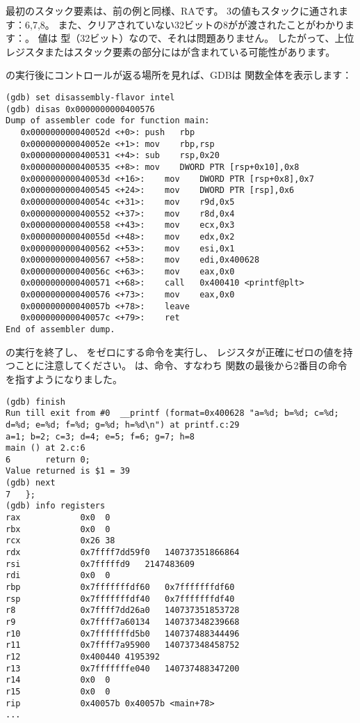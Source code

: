 最初のスタック要素は、前の例と同様、\ac{RA}です。 
3の値もスタックに通されます：6,7,8。
また、クリアされていない32ビットの8がが渡されたことがわかります：。
値は \Tint 型（32ビット）なので、それは問題ありません。 
したがって、上位レジスタまたはスタック要素の部分にはが含まれている可能性があります。

\printf の実行後にコントロールが返る場所を見れば、\ac{GDB}は \main 関数全体を表示します：

\begin{lstlisting}[style=customasmx86]
(gdb) set disassembly-flavor intel
(gdb) disas 0x0000000000400576
Dump of assembler code for function main:
   0x000000000040052d <+0>:	push   rbp
   0x000000000040052e <+1>:	mov    rbp,rsp
   0x0000000000400531 <+4>:	sub    rsp,0x20
   0x0000000000400535 <+8>:	mov    DWORD PTR [rsp+0x10],0x8
   0x000000000040053d <+16>:	mov    DWORD PTR [rsp+0x8],0x7
   0x0000000000400545 <+24>:	mov    DWORD PTR [rsp],0x6
   0x000000000040054c <+31>:	mov    r9d,0x5
   0x0000000000400552 <+37>:	mov    r8d,0x4
   0x0000000000400558 <+43>:	mov    ecx,0x3
   0x000000000040055d <+48>:	mov    edx,0x2
   0x0000000000400562 <+53>:	mov    esi,0x1
   0x0000000000400567 <+58>:	mov    edi,0x400628
   0x000000000040056c <+63>:	mov    eax,0x0
   0x0000000000400571 <+68>:	call   0x400410 <printf@plt>
   0x0000000000400576 <+73>:	mov    eax,0x0
   0x000000000040057b <+78>:	leave  
   0x000000000040057c <+79>:	ret    
End of assembler dump.
\end{lstlisting}

\printf の実行を終了し、 \EAX をゼロにする命令を実行し、 
\EAX レジスタが正確にゼロの値を持つことに注意してください。 
\RIP は、命令、すなわち \main 関数の最後から2番目の命令を指すようになりました。

\begin{lstlisting}
(gdb) finish
Run till exit from #0  __printf (format=0x400628 "a=%d; b=%d; c=%d; d=%d; e=%d; f=%d; g=%d; h=%d\n") at printf.c:29
a=1; b=2; c=3; d=4; e=5; f=6; g=7; h=8
main () at 2.c:6
6		return 0;
Value returned is $1 = 39
(gdb) next
7	};
(gdb) info registers
rax            0x0	0
rbx            0x0	0
rcx            0x26	38
rdx            0x7ffff7dd59f0	140737351866864
rsi            0x7fffffd9	2147483609
rdi            0x0	0
rbp            0x7fffffffdf60	0x7fffffffdf60
rsp            0x7fffffffdf40	0x7fffffffdf40
r8             0x7ffff7dd26a0	140737351853728
r9             0x7ffff7a60134	140737348239668
r10            0x7fffffffd5b0	140737488344496
r11            0x7ffff7a95900	140737348458752
r12            0x400440	4195392
r13            0x7fffffffe040	140737488347200
r14            0x0	0
r15            0x0	0
rip            0x40057b	0x40057b <main+78>
...
\end{lstlisting}
